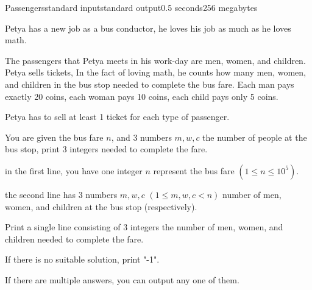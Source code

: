 \begin{problem}{Passengers}{standard input}{standard output}{0.5 seconds}{256 megabytes}

Petya has a new job as a bus conductor, he loves his job as much as he loves math.

The passengers that Petya meets in his work-day are men, women, and children.
Petya sells tickets, In the fact of loving math, he counts how many men, women, and children in the bus stop needed to complete the bus fare.
Each man pays exactly 20 coins, each woman pays 10 coins, each child pays only 5 coins.

Petya has to sell at least 1 ticket for each type of passenger.

You are given the bus fare $n$, and 3 numbers $m, w, c$ the number of people at the bus stop, print 3 integers needed to complete the fare.

\InputFile
in the first line, you have one integer $n$ represent the bus fare $(1 ≤ n ≤ 10^5)$.

the second line has 3 numbers $m, w, c$ $(1 ≤ m, w, c < n)$ number of men, women, and children at the bus stop (respectively).

\OutputFile
Print a single line consisting of 3 integers the number of men, women, and children needed to complete the fare.


If there is no suitable solution, print "-1".

\Examples

\begin{example}
%
%
\end{example}

\Note

If there are multiple answers, you can output any one of them.

\end{problem}

